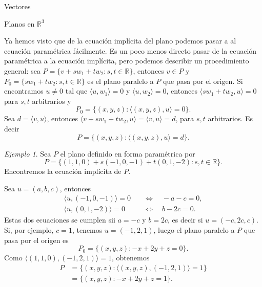 \documentclass[a4paper,12pt,twoside,spanish,reqno]{amsbook}
\numberwithin{equation}{section}
\theoremstyle{definition}
\theoremstyle{remark}
\newtheorem*{ejemplo*}{Ejemplo}
\newcommand{\la}{\langle}
\newcommand{\ra}{\rangle}
\newcommand{\R}{\mathbb R}
\begin{document}
\begin{chapter}{Vectores}
\begin{section}{Planos en $\R^3$}
    
    Ya  hemos visto que de la ecuación implícita del plano podemos pasar a al ecuación paramétrica fácilmente. Es un poco menos directo pasar de la ecuación paramétrica a la ecuación implícita, pero podemos describir un procedimiento general: sea $P = \{v + sw_1 + tw_2: s,t \in \R\}$,  entonces $v \in P$ y $P_0 = \{sw_1 + tw_2: s,t \in \R\}$  es el plano paralelo a $P$  que pasa por el origen. Si encontramos $u \ne 0$ tal que $\la u,w_1 \ra =0$ y $\la u,w_2 \ra =0$, entonces $ \la  sw_1 + tw_2, u \ra =0$ para  $s,t$ arbitrarios y 
    \begin{equation*}
    P_0 = \{(x,y,z): \la (x,y,z),u \ra =0\}. 
    \end{equation*}
    Sea $d = \la v, u \ra$, entonces $\la v + sw_1 + tw_2, u\ra = \la v , u\ra =d$, para $s,t$ arbitrarios. Es decir
    \begin{equation*}
    P = \{(x,y,z): \la (x,y,z),u \ra =d\}. 
    \end{equation*}
      
    \begin{ejemplo*}
        Sea $P$ el plano definido en forma paramétrica por 
        \begin{equation*}
            P = \{ (1,1,0) + s(-1,0,-1) + t(0,1,-2): s,t \in \R\}.
        \end{equation*}
         Encontremos la ecuación implícita de  $P$. 
         
         Sea $u= (a,b,c)$,  entonces 
        \begin{align*}
            \la u,(-1,0,-1) \ra = 0 \quad &\Leftrightarrow \quad -a -c=0, \\
            \la u,(0,1,-2) \ra = 0 \quad &\Leftrightarrow \quad b -2c=0.
        \end{align*} 
        Estas dos ecuaciones se cumplen sii $a = -c$ y $b=2c$, es decir si $u=(-c,2c,c)$. Si, por ejemplo, $c=1$, tenemos $u=(-1,2,1)$, luego el plano paralelo a $P$  que pasa por el origen es
        \begin{equation*}
        P_0 = \{(x,y,z): -x+2y+z =0\}. 
        \end{equation*}
        Como $\la (1,1,0),(-1,2,1) \ra = 1 $, obtenemos
        \begin{align*}
        P &= \{(x,y,z): \la (x,y,z),(-1,2,1) \ra =1\} \\
        &= \{(x,y,z): -x+2y+z =1\}.
        \end{align*}
    \end{ejemplo*}
   \end{section}


\end{chapter}
\end{document}

